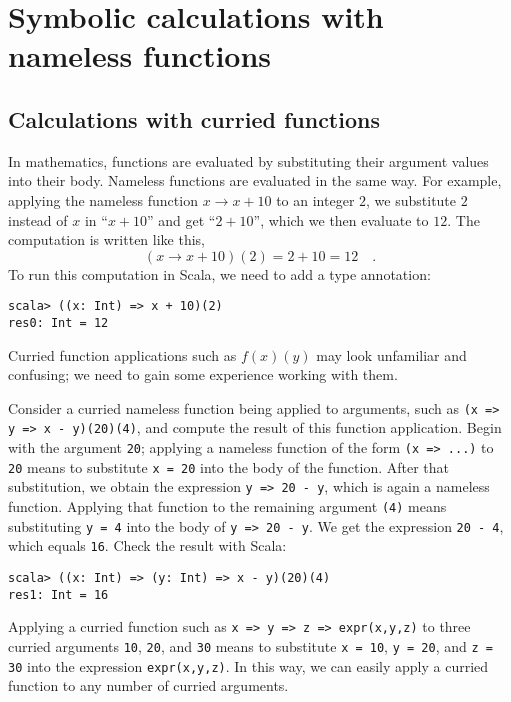 \section{Symbolic calculations with nameless functions}

\subsection{Calculations with curried functions}

In mathematics, functions are evaluated by substituting their argument
values into their body. Nameless functions are evaluated in the same
way. For example, applying the nameless function $x\rightarrow x+10$
to an integer $2$, we substitute $2$ instead of $x$ in \textquotedblleft $x+10$\textquotedblright{}
and get \textquotedblleft $2+10$\textquotedblright , which we then
evaluate to $12$. The computation is written like this, 
\[
(x\rightarrow x+10)(2)=2+10=12\quad.
\]
To run this computation in Scala, we need to add a type annotation:
\begin{lstlisting}
scala> ((x: Int) => x + 10)(2)
res0: Int = 12 
\end{lstlisting}

Curried function applications such as $f(x)(y)$ may look unfamiliar
and confusing; we need to gain some experience working with them.

Consider a curried nameless function being applied to arguments, such
as \lstinline!(x => y => x - y)(20)(4)!, and compute the result of
this function application. Begin with the argument \lstinline!20!;
applying a nameless function of the form \lstinline!(x => ...)! to
\lstinline!20! means to substitute \lstinline!x = 20! into the body
of the function. After that substitution, we obtain the expression
\lstinline!y => 20 - y!, which is again a nameless function. Applying
that function to the remaining argument \lstinline!(4)! means substituting
\lstinline!y = 4! into the body of \lstinline!y => 20 - y!. We get
the expression \lstinline!20 - 4!, which equals \lstinline!16!.
Check the result with Scala:
\begin{lstlisting}
scala> ((x: Int) => (y: Int) => x - y)(20)(4)
res1: Int = 16
\end{lstlisting}

Applying a curried function such as \lstinline!x => y => z => expr(x,y,z)!
to three curried arguments \lstinline!10!, \lstinline!20!, and \lstinline!30!
means to substitute \lstinline!x = 10!, \lstinline!y = 20!, and
\lstinline!z = 30! into the expression \lstinline!expr(x,y,z)!.
In this way, we can easily apply a curried function to any number
of curried arguments.


